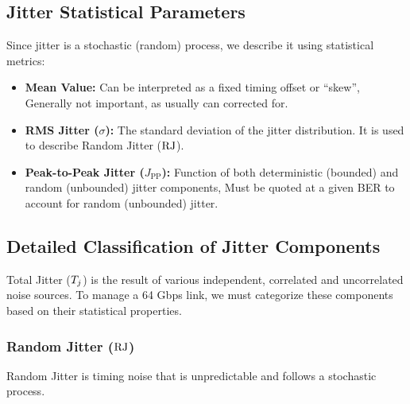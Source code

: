 \subsection{Jitter Statistical Parameters}
\label{subsec:statistical-parameters}

Since jitter is a stochastic (random) process, we describe it using statistical metrics:

\begin{itemize}

\item \textbf{Mean Value:}
    Can be interpreted as a fixed timing offset or “skew”, Generally not important, as usually can corrected for.



    \item \textbf{RMS Jitter (\(\sigma\)):} The standard deviation of the jitter distribution. It is used to describe Random Jitter (\(\mathrm{RJ}\)).
    
    \item \textbf{Peak-to-Peak Jitter (\(J_{\text{PP}}\)):} Function of both deterministic (bounded) and random
    (unbounded) jitter components, Must be quoted at a given BER to account for random
    (unbounded) jitter.
    
\end{itemize}

\subsection{Detailed Classification of Jitter Components}
\label{subsec:jitter-classification}

Total Jitter (\(T_j\)) is the result of various independent, correlated and uncorrelated noise sources. To manage a 64 Gbps link, we must categorize these components based on their statistical properties.

\subsubsection{Random Jitter (\(\mathrm{RJ}\))}
Random Jitter is timing noise that is unpredictable and follows a stochastic process.

